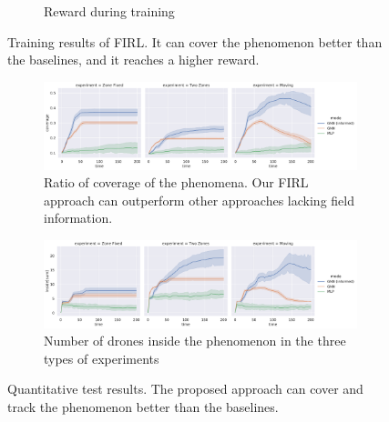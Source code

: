 \begin{figure}
\begin{subfigure}[b]{0.5\linewidth}
    \caption{Reward during training}
    \label{acsos2023:fig:reward}
  \end{subfigure}
  \caption[Training results of \ac{FIRL}.]{Training results of \ac{FIRL}.
  It can cover the phenomenon better than the baselines, and it reaches a higher reward. 
  }
  \label{acsos2023:fig:training}
\end{figure}



\begin{figure}
  \centering
  \begin{subfigure}[b]{0.75\linewidth}
    \includegraphics[width=\linewidth]{papers/acsos2023/imgs/coverage-test.pdf}
    \caption[Ratio of coverage of the phenomena in \ac{FIRL}]{Ratio of coverage of the phenomena. Our \ac{FIRL} approach can outperform other approaches lacking field information.}
    \label{acsos2023:fig:coverage-test}
  \end{subfigure}
  \begin{subfigure}[b]{0.75\linewidth}
    \includegraphics[width=\linewidth]{papers/acsos2023/imgs/inside-test}
    \caption{Number of drones inside the phenomenon in the three types of experiments}
    \label{acsos2023:fig:inside-test}
  \end{subfigure}
	\caption[Quantitative test results of \ac{FIRL}]{Quantitative test results.
	 	The proposed approach can cover and track the phenomenon better than the baselines.
	}
	\label{acsos2023:fig:test}
\end{figure}
